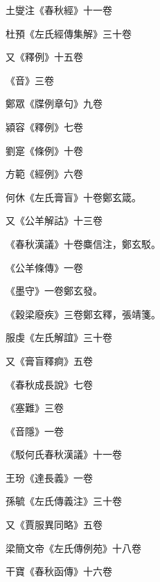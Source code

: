 \begin{pinyinscope}
 土燮注《春秋經》十一卷



 杜預《左氏經傳集解》三十卷



 又《釋例》十五卷



 《音》三卷



 鄭眾《牒例章句》九卷



 潁容《釋例》七卷



 劉寔《條例》十卷



 方範《經例》六卷



 何休《左氏膏盲》十卷鄭玄箴。



 又《公羊解詁》十三卷



 《春秋漢議》十卷麋信注，鄭玄駁。



 《公羊條傳》一卷



 《墨守》一卷鄭玄發。



 《穀梁廢疾》三卷鄭玄釋，張靖箋。



 服虔《左氏解誼》三十卷



 又《膏盲釋痾》五卷



 《春秋成長說》七卷



 《塞難》三卷



 《音隱》一卷



 《駁何氏春秋漢議》十一卷



 王玢《達長義》一卷



 孫毓《左氏傳義注》三十卷



 又《賈服異同略》五卷



 梁簡文帝《左氏傳例苑》十八卷



 干寶《春秋函傳》十六卷




\end{pinyinscope}
